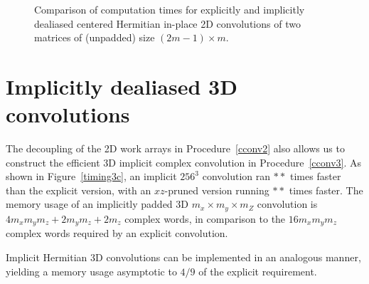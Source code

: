 \documentclass[final]{siamltex}
\begin{document}
\begin{figure}[htbp]
\begin{minipage}{0.5\linewidth}
\begin{center}
\caption{Comparison of computation times for explicitly and implicitly
dealiased centered Hermitian in-place 2D convolutions of two matrices of
(unpadded) size $(2m-1)\times m$.}
\label{timing2r}
\end{center}
\end{minipage}
\end{figure}


\section{Implicitly dealiased 3D convolutions}\label{3d}

The decoupling of the 2D work arrays in Procedure~\ref{cconv2}
also allows us to construct the efficient 3D implicit complex convolution
in Procedure~\ref{cconv3}. As shown in Figure~\ref{timing3c}, an implicit
$256^3$ convolution ran $**$ times faster than the explicit version, with
an $xz$-pruned version running $**$ times faster. The memory usage of an
implicitly padded 3D $m_x\times m_y\times m_Z$ convolution is
$4m_xm_ym_z+2m_y m_z+2m_z$ complex words, in comparison to the
$16m_xm_ym_z$ complex words required by an explicit convolution.

Implicit Hermitian 3D convolutions can be implemented in an analogous
manner, yielding a memory usage asymptotic to $4/9$ of the explicit
requirement.

\begin{function}[htbp]
  \Return \xf\;
\caption{cconv3(matrix~{\sf f}, matrix~{\sf g}) 
returns an in-place implicitly dealiased convolution of
$m_x\times m_y\times m_z$ matrices {\sf f} and {\sf g} using temporary
$m_x\times m_y\times m_z$ matrices ${\sf U}$ and ${\sf V}$, 
$m_y\times m_z$ matrices ${\sf u}_2$ and ${\sf v}_2$,
and vectors ${\sf u}_1$ and ${\sf v}_1$ of length~$m_z$.}\label{cconv3}
\end{function}
\end{document}
